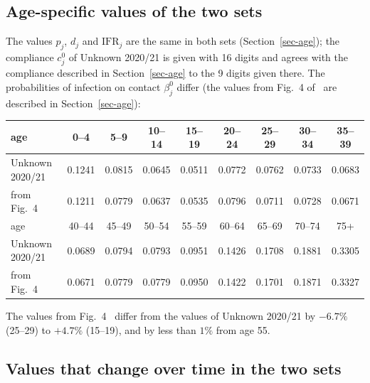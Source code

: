 \documentclass[11pt]{article}
\theoremstyle{remark}
\begin{document}
\subsection{Age-specific values of the two sets}\label{sec-params-age}

The values $p_j$, $d_j$ and $\mathrm{IFR}_j$ are the same in both sets
(Section~\ref{sec-age}); the compliance $c_j^0$ of Unknown 2020/21 is given with 16 digits and
agrees with the compliance described in Section~\ref{sec-age} to the 9 digits given there.
The probabilities of infection on contact $\beta_j^0$ differ (the values from
Fig.~4 of~\cite{2023Glasser_Feng} are described in Section~\ref{sec-age}):
\begin{center}
\small
\begin{tabular}{l*{8}{c}}
age & 0--4 & 5--9 & 10--14 & 15--19 & 20--24 & 25--29 & 30--34 & 35--39\\\hline
Unknown 2020/21 & 0.1241 & 0.0815 & 0.0645 & 0.0511 & 0.0772 & 0.0762 & 0.0733 & 0.0683\\
from Fig.~4~\cite{2023Glasser_Feng} & 0.1211 & 0.0779 & 0.0637 & 0.0535 & 0.0796 & 0.0711 & 0.0728 & 0.0671\\\hline
age & 40--44 & 45--49 & 50--54 & 55--59 & 60--64 & 65--69 & 70--74 & 75+\\\hline
Unknown 2020/21 & 0.0689 & 0.0794 & 0.0793 & 0.0951 & 0.1426 & 0.1708 & 0.1881 & 0.3305\\
from Fig.~4~\cite{2023Glasser_Feng} & 0.0671 & 0.0779 & 0.0779 & 0.0950 & 0.1422 & 0.1701 & 0.1871 & 0.3327
\end{tabular}
\end{center}
The values from Fig.~4~\cite{2023Glasser_Feng} differ from the values of Unknown 2020/21 by $-6.7\%$ (25--29) to $+4.7\%$
(15--19), and by less than $1\%$ from age 55.

\subsection{Values that change over time in the two sets}\label{sec-params-var}
\end{document}
